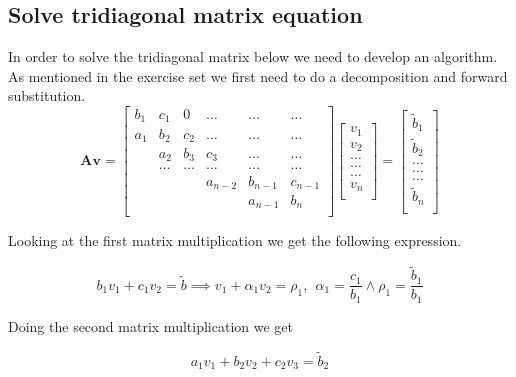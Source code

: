 \documentclass[reprint, english,notitlepage]{revtex4-1}  %
\begin{document}
\subsection{Solve tridiagonal matrix equation}

In order to solve the tridiagonal matrix below we need to develop an algorithm. As mentioned in the exercise set \citep{oppgavetekst} we first need to do a decomposition and forward substitution.
\begin{equation}
\mathbf{A}\mathbf{v} = \begin{bmatrix}
b_1& c_1 & 0 &\dots   & \dots &\dots \\
a_1 & b_2 & c_2 &\dots &\dots &\dots \\
& a_2 & b_3 & c_3 & \dots & \dots \\
& \dots   & \dots &\dots   &\dots & \dots \\
&   &  &a_{n-2}  &b_{n-1}& c_{n-1} \\
&    &  &   &a_{n-1} & b_n \\
\end{bmatrix}\begin{bmatrix}
v_1\\
v_2\\
\dots \\
\dots  \\
\dots \\
v_n\\
\end{bmatrix}
=\begin{bmatrix}
\tilde{b}_1\\
\tilde{b}_2\\
\dots \\
\dots \\
\dots \\
\tilde{b}_n\\
\end{bmatrix}
\label{eq:mat_gen}
\end{equation}

Looking at the first matrix multiplication we get the following expression.

\begin{equation}
	b_1 v_1 + c_1 v_2 = \tilde{b} \implies v_1 + \alpha_1 v_2 = \rho _1, \ \ \alpha_1 = \frac{c_1}{b_1} \wedge \rho_1 = \frac{\tilde{b}_1}{b_1}
	\label{eq:mat1}
\end{equation}

Doing the second matrix multiplication we get

\begin{equation}
	a_1 v_1 + b_2 v_2 + c_2 v_3 = \tilde{b}_2
	\label{eq:mat2}
\end{equation}
\end{document}
